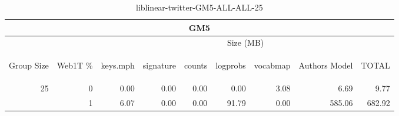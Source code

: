 \begin{center}
\begin{table}[htbp]
\begin{tabular}{ | r | r | r | r | r | r | r | r | r |}
\hline
\multicolumn{9}{|c|}{GM5}\\
\hline
 & & \multicolumn{7}{|c|}{Size (MB)}\\ \cline{3-9}
\begin{sideways}Group Size\end{sideways} & \begin{sideways}Web1T \% \end{sideways} & \begin{sideways}keys.mph\end{sideways} & \begin{sideways}signature\end{sideways} & \begin{sideways}counts\end{sideways} & \begin{sideways}logprobs\end{sideways} & \begin{sideways}vocabmap\end{sideways} & \begin{sideways}Authors Model \end{sideways} & \begin{sideways}TOTAL\end{sideways}\\
\hline
\multirow{1}{*}{25}
 & 0 & 0.00 & 0.00 & 0.00 & 0.00 & 3.08 & 6.69 & 9.77\\ \cline{2-9}
 & 1 & 6.07 & 0.00 & 0.00 & 91.79 & 0.00 & 585.06 & 682.92\\ \cline{2-9}
\hline
\end{tabular}
\caption{liblinear-twitter-GM5-ALL-ALL-25}
\label{table:liblinear-twitter-GM5-ALL-ALL-25}
\end{table}
\end{center}

